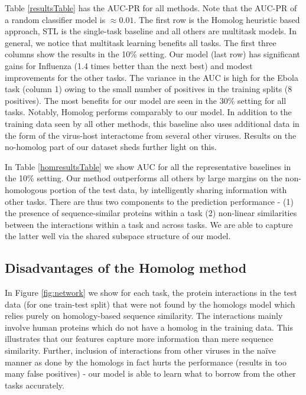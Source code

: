 \documentclass{bioinfo}
\begin{document}
Table \ref{resultsTable} has the AUC-PR for all methods. 
Note that the AUC-PR of a random classifier model is $\approx 0.01$.
The first row is the Homolog heuristic based approach, STL is the single-task baseline and all others are multitask models. In general, we notice that multitask learning benefits
all tasks. The first three columns show the results in the 10\% setting. 
Our model (last row) has significant gains for Influenza (1.4 times better than the next best) and modest improvements for the other tasks.
The variance in the AUC is high for the Ebola task (column 1) owing to the small number of positives 
in the training splits (8 positives).
The most benefits for our model are seen in the 30\% setting for all tasks.
Notably, Homolog performs comparably to our model. In addition to the training data seen by all other methods, this baseline also uses additional data in the form of the virus-host interactome from several other viruses. Results on the no-homolog part of our dataset sheds further light on this.

In Table \ref{homresultsTable} we show AUC for all the representative baselines in the 10\% setting. Our method outperforms all others by large margins on the non-homologous portion of the test data, by intelligently sharing information with other tasks. There are thus two components to the prediction performance - (1) the presence of sequence-similar proteins within a task (2) non-linear similarities between the interactions within a task and across tasks. We are able to capture the latter well via the shared subspace structure of our model.




\subsection{Disadvantages of the Homolog method}
In Figure \ref{fig:network} we show for each task, the protein interactions in the test data (for one train-test split) that were not found by the homologs model which relies purely on homology-based sequence similarity. The interactions mainly involve human proteins which do not have a homolog in the training data. This illustrates that our features capture more information than mere sequence similarity. Further, inclusion of interactions from other viruses in the na\"ive manner as done by the homologs in fact hurts the performance (results in too many false positives) - our model is able to learn what to borrow from the other tasks accurately.
\end{document}
